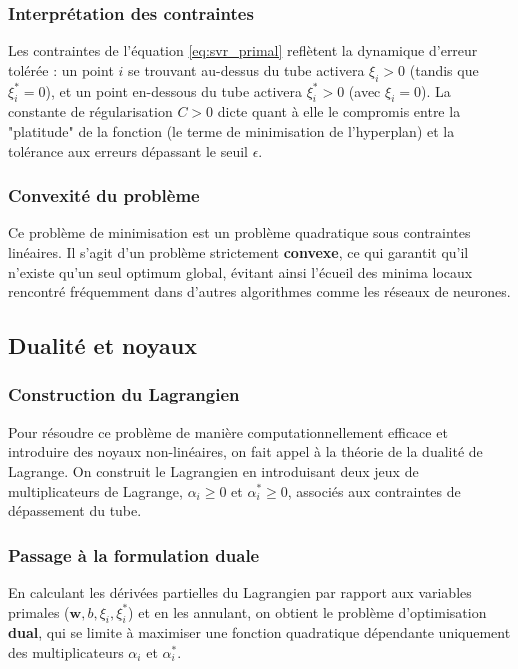 \subsubsection{Interprétation des contraintes}
Les contraintes de l'équation \ref{eq:svr_primal} reflètent la dynamique d'erreur tolérée : un point $i$ se trouvant au-dessus du tube activera $\xi_i > 0$ (tandis que $\xi_i^* = 0$), et un point en-dessous du tube activera $\xi_i^* > 0$ (avec $\xi_i = 0$). La constante de régularisation $C > 0$ dicte quant à elle le compromis entre la "platitude" de la fonction (le terme de minimisation de l'hyperplan) et la tolérance aux erreurs dépassant le seuil $\epsilon$.

\subsubsection{Convexité du problème}
Ce problème de minimisation est un problème quadratique sous contraintes linéaires. Il s'agit d'un problème strictement \textbf{convexe}, ce qui garantit qu'il n'existe qu'un seul optimum global, évitant ainsi l'écueil des minima locaux rencontré fréquemment dans d'autres algorithmes comme les réseaux de neurones.

\subsection{Dualité et noyaux}

\subsubsection{Construction du Lagrangien}
Pour résoudre ce problème de manière computationnellement efficace et introduire des noyaux non-linéaires, on fait appel à la théorie de la dualité de Lagrange. On construit le Lagrangien en introduisant deux jeux de multiplicateurs de Lagrange, $\alpha_i \geq 0$ et $\alpha_i^* \geq 0$, associés aux contraintes de dépassement du tube.

\subsubsection{Passage à la formulation duale}
En calculant les dérivées partielles du Lagrangien par rapport aux variables primales ($\mathbf{w}, b, \xi_i, \xi_i^*$) et en les annulant, on obtient le problème d'optimisation \textbf{dual}, qui se limite à maximiser une fonction quadratique dépendante uniquement des multiplicateurs $\alpha_i$ et $\alpha_i^*$.

